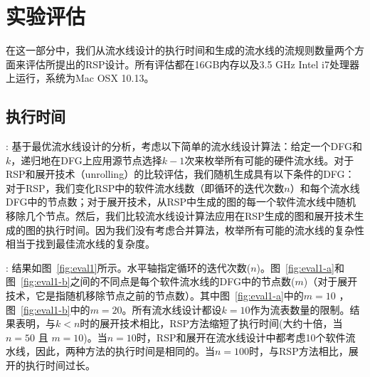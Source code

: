 \section{实验评估}
\label{sec:eval}

在这一部分中，我们从流水线设计的执行时间和生成的流水线的流规则数量两个方面来评估所提出的RSP设计。所有评估都在16GB内存以及3.5 GHz Intel i7处理器上运行，系统为Mac OSX 10.13。

\subsection{执行时间}
: 基于最优流水线设计的分析，考虑以下简单的流水线设计算法：给定一个DFG和$k$，递归地在DFG上应用源节点选择$k-1$次来枚举所有可能的硬件流水线。对于RSP和展开技术（unrolling）的比较评估，我们随机生成具有以下条件的DFG：对于RSP，我们变化RSP中的软件流水线数（即循环的迭代次数$n$）和每个流水线DFG中的节点数；对于展开技术，从RSP中生成的图的每一个软件流水线中随机移除几个节点。然后，我们比较流水线设计算法应用在RSP生成的图和展开技术生成的图的执行时间。因为我们没有考虑合并算法，枚举所有可能的流水线的复杂性相当于找到最佳流水线的复杂度。


: 结果如图~\ref{fig:eval1}所示。水平轴指定循环的迭代次数($n$)。图~\ref{fig:eval1-a}和图~\ref{fig:eval1-b}之间的不同点是每个软件流水线的DFG中的节点数($m$)（对于展开技术，它是指随机移除节点之前的节点数）。其中图~\ref{fig:eval1-a}中的$m = 10$ ，图~\ref{fig:eval1-b}中的$m = 20$。所有流水线设计都设$k=10$作为流表数量的限制。结果表明，与$k < n$时的展开技术相比，RSP方法缩短了执行时间(大约十倍，当$n = 50$ 且 $m = 10$)。当$n = 10$时，RSP和展开在流水线设计中都考虑10个软件流水线，因此，两种方法的执行时间是相同的。当$n = 100$时，与RSP方法相比，展开的执行时间过长。

